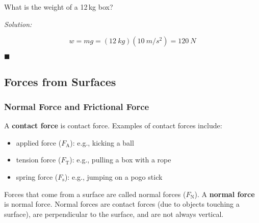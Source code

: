 \documentclass[dvipsnames]{article}
\begin{document}
\begin{example}
What is the weight of a 12\,kg box?
\end{example}

\textit{Solution:}

\begin{equation*}
    w = mg = (\SI{12}{kg})(\SI{10}{m/s^2}) = \boxed{\SI{120}{N}}    
\end{equation*}

\hfill $\blacksquare$

\subsection{Forces from Surfaces}

\subsubsection{Normal Force and Frictional Force}

A \textbf{\gls{contact force}} is \glsdesc{contact force}. Examples of contact forces include:

\begin{itemize}[topsep=0pt,itemsep=0pt]
    \item applied force ($F_\mathrm{A}$): e.g., kicking a ball
    \item tension force ($F_\mathrm{T}$): e.g., pulling a box with a rope
    \item spring force ($F_\mathrm{s}$): e.g., jumping on a pogo stick
\end{itemize}


Forces that come from a surface are called normal forces ($F_\mathrm{N}$). A \textbf{\gls{normal force}} is \glsdesc{normal force}. Normal forces are contact forces (due to objects touching a surface), are perpendicular to the surface, and are not always vertical.

\begin{center}
\hspace{1.5cm}
\end{center}
\end{document}
